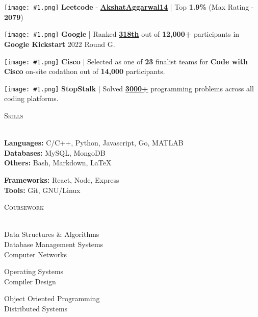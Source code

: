 \documentclass[a4paper]{article}
\newcommand{\tinyBulletSep} { \vspace{1mm} }
\newcommand{\sectionSep} { \vspace{4mm} }
\newcommand{\lineunder} {
    \vspace*{-8pt} \\
    \hspace*{-15pt} \hrulefill \\
}
\newcommand{\header} [1] {
    {\hspace*{-18pt}\vspace*{6pt} {
        \fontfamily{qcs}\selectfont \large \scshape #1
    }}
    \vspace*{-6pt} \lineunder
    \vspace{0.5mm}
}
\newcommand{\image}[1]{
    \begingroup\normalfont
    \Large
    \texttt{[image: \#1.png]}%
    \endgroup
}
\begin{document}
\image{lc} \textbf{Leetcode} - \textbf{\href{https://leetcode.com/AkshatAggarwal14/}{AkshatAggarwal14}} | Top \textbf{1.9\%} (Max Rating - \textbf{2079})
\tinyBulletSep

\image{google} \textbf{Google} | Ranked \textbf{\href{https://drive.google.com/file/d/1cAIdPLOMWYXWl6qaP8iQeVJv8y2TtfIG/view}{318th}} out of \textbf{12,000+} participants in \textbf{Google Kickstart} 2022 Round G.
\tinyBulletSep

\image{cisco} \textbf{Cisco} | Selected as one of \textbf{23} finalist teams for \textbf{Code with Cisco} on-site codathon out of \textbf{14,000} participants.
\tinyBulletSep

\image{stopstalk} \textbf{StopStalk} | Solved \textbf{\href{https://www.stopstalk.com/user/profile/master_mind14}{3000+}} programming problems across all coding platforms.
\sectionSep


\header{Skills}
\begin{minipage}[t]{0.6\textwidth}
    \textbf{Languages:} C/C++, Python, Javascript, Go, MATLAB\\
    \textbf{Databases:} MySQL, MongoDB\\
    \textbf{Others:} Bash, Markdown, \LaTeX
\end{minipage}
\hfill
\begin{minipage}[t]{0.33\textwidth}
    \textbf{Frameworks:} React, Node, Express\\
    \textbf{Tools:} Git, GNU/Linux
\end{minipage}
\sectionSep

\header{Coursework}
\begin{minipage}[t]{0.4\textwidth}
    Data Structures \& Algorithms\\
    Database Management Systems\\
    Computer Networks
\end{minipage}
\hfill
\begin{minipage}[t]{0.25\textwidth}
    Operating Systems\\
    Compiler Design
\end{minipage}
\hfill
\begin{minipage}[t]{0.3\textwidth}
    Object Oriented Programming\\
    Distributed Systems
\end{minipage}
\hfill
\sectionSep
\end{document}
